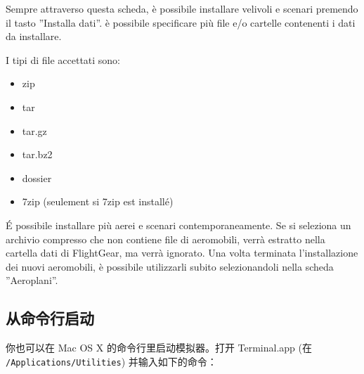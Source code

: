 \begin{itemize}
{Sempre attraverso questa scheda, \`{e} possibile installare velivoli e scenari premendo
il tasto ''Installa dati''. \`{e} possibile specificare pi\`{u} file e/o cartelle
contenenti i dati da installare.

I tipi di file accettati sono:
\begin{itemize}
\item zip
\item tar
\item tar.gz
\item tar.bz2
\item dossier
\item 7zip (seulement si 7zip est install\'{e})
\end{itemize}

\'{E} possibile installare pi\`{u} aerei e scenari contemporaneamente. Se si seleziona un
archivio compresso che non contiene file di aeromobili, verr\`{a} estratto nella
cartella dati di FlightGear, ma verr\`{a} ignorato. Una volta terminata
l'installazione dei nuovi aeromobili, \`{e} possibile utilizzarli subito
selezionandoli nella scheda ''Aeroplani''.
}{}

\ifchinese
\subsection{从命令行启动}
你也可以在 Mac OS X 的命令行里启动模拟器。打开 Terminal.app (在 \texttt{/Applications/Utilities}) 并输入如下的命令：
\fi



\end{itemize}
